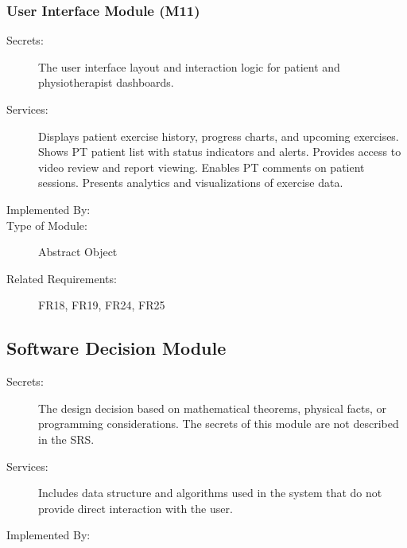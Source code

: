 \documentclass[12pt, titlepage]{article}
\begin{document}
\subsubsection{User Interface Module (M11)}
\begin{description}
	\item[Secrets:] The user interface layout and interaction logic for patient and physiotherapist dashboards.
	\item[Services:] Displays patient exercise history, progress charts, and upcoming exercises. Shows PT patient list with status indicators and alerts. Provides access to video review and report viewing. Enables PT comments on patient sessions. Presents analytics and visualizations of exercise data.
	\item[Implemented By:] \progname{}
	\item[Type of Module:] Abstract Object
	\item[Related Requirements:] FR18, FR19, FR24, FR25
\end{description}


\subsection{Software Decision Module}

\begin{description}
	\item[Secrets:] The design decision based on mathematical theorems, physical facts, or programming considerations. The secrets of this module are not described in the SRS.
	\item[Services:] Includes data structure and algorithms used in the system that do not provide direct interaction with the user.
	\item[Implemented By:] \progname{}
\end{description}
\end{document}
